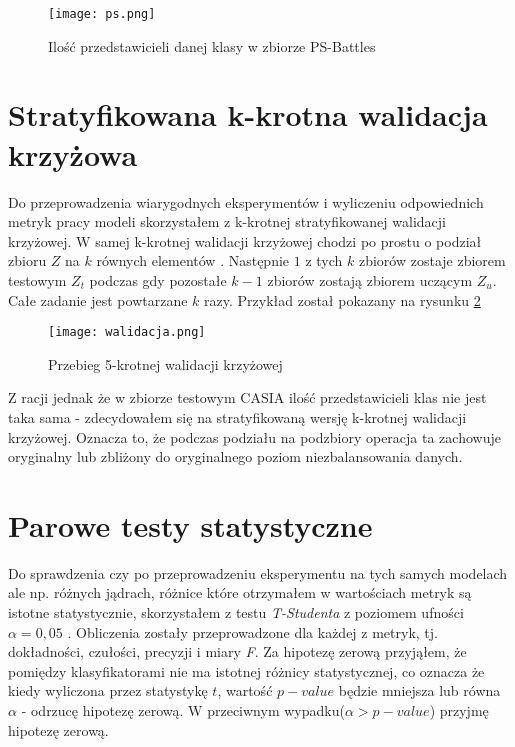 \begin{figure}[h!]
	\texttt{[image: ps.png]}
	\centering
	\caption{Ilość przedstawicieli danej klasy w zbiorze PS-Battles}
	\label{fig:ps}
\end{figure}

\section{Stratyfikowana k-krotna walidacja krzyżowa}

Do przeprowadzenia wiarygodnych eksperymentów i wyliczeniu odpowiednich metryk pracy modeli skorzystałem z k-krotnej stratyfikowanej walidacji krzyżowej. W samej k-krotnej walidacji krzyżowej chodzi po prostu o podział zbioru $Z$ na $k$ równych elementów \cite{hands_on}. Następnie $1$ z tych $k$ zbiorów zostaje zbiorem testowym $Z_{t}$ podczas gdy pozostałe $k-1$ zbiorów zostają zbiorem uczącym $Z_u$. Całe zadanie jest powtarzane $k$ razy. Przykład został pokazany na rysunku \ref{fig:walidacja}

\begin{figure}[h!]
	\texttt{[image: walidacja.png]}
	\centering
	\caption{Przebieg 5-krotnej walidacji krzyżowej}
	\label{fig:walidacja}
\end{figure}

Z racji jednak że w zbiorze testowym CASIA \cite{casia} ilość przedstawicieli klas nie jest taka sama - zdecydowałem się na stratyfikowaną wersję k-krotnej walidacji krzyżowej. Oznacza to, że podczas podziału na podzbiory operacja ta zachowuje oryginalny lub zbliżony do oryginalnego poziom niezbalansowania danych.

\section{Parowe testy statystyczne}

Do sprawdzenia czy po przeprowadzeniu eksperymentu na tych samych modelach ale np. różnych jądrach, różnice które otrzymałem w wartościach metryk są istotne statystycznie, skorzystałem z testu \textit{T-Studenta} z poziomem ufności $\alpha = 0,05$ \cite{stata}. Obliczenia zostały przeprowadzone dla każdej z metryk, tj. dokładności, czułości, precyzji i miary \textit{F}. Za hipotezę zerową przyjąłem, że pomiędzy klasyfikatorami nie ma istotnej różnicy statystycznej, co oznacza że kiedy wyliczona przez statystykę $t$, wartość $p-value$ będzie mniejsza lub równa $\alpha$ - odrzucę hipotezę zerową. W przeciwnym wypadku($\alpha>p-value$) przyjmę hipotezę zerową.

